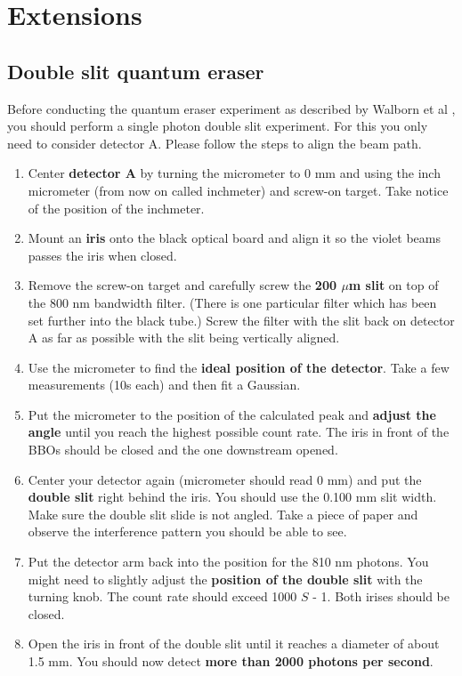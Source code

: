 \documentclass{../lab}
\begin{document}
\section{Extensions}

\subsection{Double slit quantum eraser}

Before conducting the quantum eraser experiment as described by Walborn et al \cite{Walborn}, you should perform a single photon double slit experiment. For this you only need to consider detector A. Please follow the steps to align the beam path.

\begin{enumerate}
    \item Center \textbf{detector A} by turning the micrometer to 0 mm and using the inch micrometer (from now on called inchmeter) and screw-on target. Take notice of the position of the inchmeter.

    \item Mount an \textbf{iris} onto the black optical board and align it so the violet beams passes the iris when closed.

    \item Remove the screw-on target and carefully screw the \textbf{200 $\mu$m slit} on top of the 800 nm bandwidth filter. (There is one particular filter which has been set further into the black tube.) Screw the filter with the slit back on detector A as far as possible with the slit being vertically aligned.

    \item Use the micrometer to find the \textbf{ideal position of the detector}. Take a few measurements (10s each) and then fit a Gaussian.

    \item Put the micrometer to the position of the calculated peak and \textbf{adjust the angle} until you reach the highest possible count rate. The iris in front of the BBOs should be closed and the one downstream opened.

    \item Center your detector again (micrometer should read 0 mm) and put the \textbf{double slit} right behind the iris. You should use the 0.100 mm slit width. Make sure the double slit slide is not angled. Take a piece of paper and observe the interference pattern you should be able to see.

    \item Put the detector arm back into the position for the 810 nm photons. You might need to slightly adjust the \textbf{position of the double slit} with the turning knob. The count rate should exceed 1000 $S$ - 1. Both irises should be closed.

    \item Open the iris in front of the double slit until it reaches a diameter of about 1.5 mm. You should now detect \textbf{more than 2000 photons per second}.

\end{enumerate}
\end{document}

